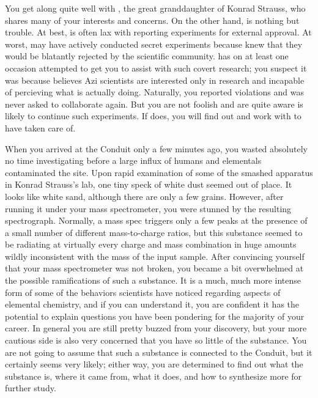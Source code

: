 \documentclass[char]{elementals}
\begin{document}
You get along quite well with \cGD{\intro}, the great granddaughter of Konrad Strauss, who shares many of your interests and concerns. On the other hand, \cMS{} is nothing but trouble. At best, \cMS{\they} is often lax with reporting \cMS{\their} experiments for external approval. At worst, \cMS{\they} may have actively conducted secret experiments because \cMS{\they} knew that they would be blatantly rejected by the scientific community. \cMS{\They} has on at least one occasion attempted to get you to assist with such covert research; you suspect it was because \cMS{\they} believes Azi scientists are interested only in research and incapable of percieving what \cMS{\they} is actually doing. Naturally, you reported \cMS{\their} violations and was never asked to collaborate again. But you are not foolish and are quite aware \cMS{\they} is likely to continue such experiments. If \cMS{\they} does, you will find out and work with \cDiplomat{} to have \cMS{\them} taken care of.

When you arrived at the Conduit only a few minutes ago, you wasted absolutely no time investigating before a large influx of humans and elementals contaminated the site. Upon rapid examination of some of the smashed apparatus in Konrad Strauss's lab, one tiny speck of white dust seemed out of place. It looks like white sand, although there are only a few grains. However, after running it under your mass spectrometer, you were stunned by the resulting spectrograph. Normally, a mass spec triggers only a few peaks at the presence of a small number of different mass-to-charge ratios, but this substance seemed to be radiating at virtually every charge and mass combination in huge amounts wildly inconsistent with the mass of the input sample. After convincing yourself that your mass spectrometer was not broken, you became a bit overwhelmed at the possible ramifications of such a substance. It is a much, much more intense form of some of the behaviors scientists have noticed regarding aspects of elemental chemistry, and if you can understand it, you are confident it has the potential to explain questions you have been pondering for the majority of your career. In general you are still pretty buzzed from your discovery, but your more cautious side is also very concerned that you have so little of the substance. You are not going to assume that such a substance is connected to the Conduit, but it certainly seems very likely; either way, you are determined to find out what the substance is, where it came from, what it does, and how to synthesize more for further study.
\end{document}
